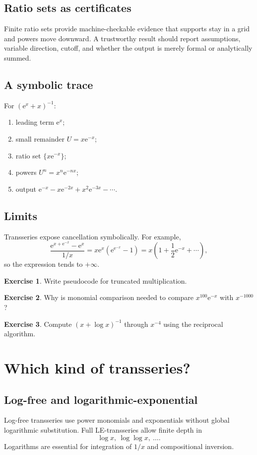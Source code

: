 \documentclass[11pt,oneside,openany]{book}
\newcommand{\e}{\mathrm{e}}
\theoremstyle{plain}
\theoremstyle{definition}
\newtheorem{exercise}{Exercise}[chapter]
\theoremstyle{remark}
\begin{document}
\section{Ratio sets as certificates}
Finite ratio sets provide machine-checkable evidence that supports stay in a grid and powers move downward. A trustworthy result should report assumptions, variable direction, cutoff, and whether the output is merely formal or analytically summed.

\section{A symbolic trace}
For $(\e^x+x)^{-1}$:
\begin{enumerate}
  \item leading term $\e^x$;
  \item small remainder $U=x\e^{-x}$;
  \item ratio set $\{x\e^{-x}\}$;
  \item powers $U^n=x^n\e^{-nx}$;
  \item output $\e^{-x}-x\e^{-2x}+x^2\e^{-3x}-\cdots$.
\end{enumerate}

\section{Limits}
Transseries expose cancellation symbolically. For example,
\[
  \frac{\e^{x+\e^{-x}}-\e^x}{1/x}
  =x\e^x(\e^{\e^{-x}}-1)
  =x\left(1+\frac12\e^{-x}+\cdots\right),
\]
so the expression tends to $+\infty$.

\begin{exercise}
Write pseudocode for truncated multiplication.
\end{exercise}

\begin{exercise}
Why is monomial comparison needed to compare $x^{100}\e^{-x}$ with $x^{-1000}$?
\end{exercise}

\begin{exercise}
Compute $(x+\log x)^{-1}$ through $x^{-4}$ using the reciprocal algorithm.
\end{exercise}


\chapter{Which kind of transseries?}
\label{ch:variants}

\section{Log-free and logarithmic-exponential}
Log-free transseries use power monomials and exponentials without global logarithmic substitution. Full LE-transseries allow finite depth in
\[
  \log x,\ \log\log x,\ \ldots.
\]
Logarithms are essential for integration of $1/x$ and compositional inversion.
\end{document}
